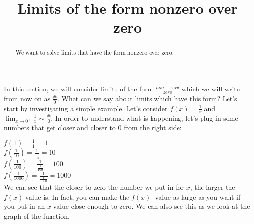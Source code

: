\documentclass{ximera}
\title{Limits of the form nonzero over zero}
\begin{document}
\begin{abstract}
  We want to solve limits that have the form nonzero over zero.
\end{abstract}

\maketitle


In this section, we will consider limits of the form $\frac{non-zero}{zero}$ which we will write from now on as $\frac{\#}{0}$.  What can we say about limits which have this form?  Let's start by investigating a simple example.  Let's consider $f(x)=\frac{1}{x}$ and $\lim_{x\to 0^+} \frac{1}{x}  \sim \frac{\#}{0}$.  In order to understand what is happening, let's plug in some numbers that get closer and closer to 0 from the right side:

$f(1) = \frac{1}{1}=1$\\ \vspace{.1in}
$f\left(\frac{1}{10}\right) = \frac{1}{\frac{1}{10}}=10$\\ \vspace{.1in}
$f\left(\frac{1}{100}\right) = \frac{1}{\frac{1}{100}}=100$\\ \vspace{.1in}
$f\left(\frac{1}{1000}\right) = \frac{1}{\frac{1}{1000}}=1000$\\ 

We can see that the closer to zero the number we put in for $x$, the larger the $f(x)$ value is.  In fact, you can make the $f(x)$- value as large as you want if you put in an $x$-value close enough to zero.  We can also see this as we look at the graph of the function.

\end{document}
